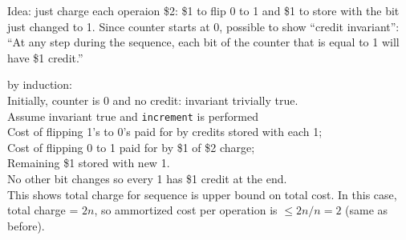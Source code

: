 \noindent Idea: just charge each operaion \$2: \$1 to flip 0 to 1 and \$1 to store with the bit just changed to 1. Since counter starts at 0, possible to show ``credit invariant'': \\

``At any step during the sequence, each bit of the counter that is equal to 1 will have \$1 credit.'' \\

\mpproof

\noindent by induction: \\

\noindent Initially, counter is 0 and no credit: invariant trivially true. \\
Assume invariant true and \texttt{increment} is performed \\
\indent Cost of flipping 1's to 0's paid for by credits stored with each 1; \\
\indent Cost of flipping 0 to 1 paid for by \$1 of \$2 charge; \\
\indent Remaining \$1 stored with new 1. \\
No other bit changes so every 1 has \$1 credit at the end. \\

\noindent This shows total charge for sequence is upper bound on total cost. In this case, total charge = $2n$, so ammortized cost per operation is $\leq 2n/n = 2$ (same as before).


